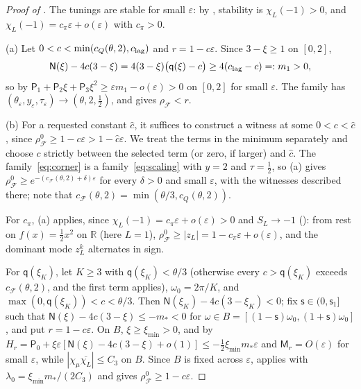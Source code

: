 \documentclass[11pt]{article}
\theoremstyle{definition}
\theoremstyle{remark}
\newcommand{\R}{\mathbb R}
\newcommand{\cF}{\mathcal F}
\newcommand{\sfP}{\mathsf P}
\newcommand{\rhoF}{\rho_{\cF}}
\newcommand{\rhoz}{\rho_{\cF}^{0}}
\newcommand{\cQ}{c_{Q}}
\newcommand{\cFF}{c_{\cF}}
\newcommand{\clag}{c_{\rm lag}}\newcommand{\clayer}{c_{\rm layer}}\newcommand{\cdisc}{c_{\rm disc}}
\newcommand{\cpi}{c_{\pi}}
\begin{document}
\begin{proof}[Proof of ]
The tunings are stable for small \(\varepsilon\): by , stability is
\(\chi_L(-1)>0\), and \(\chi_L(-1)=\cpi\varepsilon+o(\varepsilon)\) with \(\cpi>0\).

(a) Let \(0<c<\min(\cQ(\theta,2),\clag)\) and \(r=1-c\varepsilon\).  Since \(3-\xi\ge1\) on \([0,2]\),
\[
\mathsf N(\xi)-4c(3-\xi)=4(3-\xi)\bigl(\mathsf q(\xi)-c\bigr)\ge4(\clag-c)=:m_1>0 ,
\]
so by  \(\sfP_1+\sfP_2\xi+\sfP_3\xi^2\ge\varepsilon m_1-o(\varepsilon)>0\) on \([0,2]\) for small \(\varepsilon\).  The family has
\((\theta_\varepsilon,y_\varepsilon,\tau_\varepsilon)\to(\theta,2,\frac12)\), and  gives \(\rhoF<r\).

(b) For a requested constant \(\widehat c\), it suffices to construct a witness
at some \(0<c<\widehat c\), since
\(\rhoz\ge1-c\varepsilon>1-\widehat c\varepsilon\).
We treat the terms in the minimum separately and choose \(c\) strictly between
the selected term (or zero, if larger) and \(\widehat c\).
The family~\eqref{eq:corner} is a family~\eqref{eq:scaling} with \(y=2\)
and \(\tau=\frac12\), so (a) gives
\(\rhoz\ge e^{-(\cFF(\theta,2)+\delta)\varepsilon}\) for every \(\delta>0\) and small \(\varepsilon\), with the witnesses described there; note that
\(\cFF(\theta,2)=\min(\theta/3,\cQ(\theta,2))\).

For \(\cpi\), (a) applies, since \(\chi_L(-1)=\cpi\varepsilon+o(\varepsilon)>0\) and \(S_L\to-1\) (): from rest on \(f(x)=\frac12x^2\) on \(\R\) (here \(L=1\)),
\(\rhoz\ge|z_L|=1-\cpi\varepsilon+o(\varepsilon)\), and the dominant mode \(z_L^k\) alternates in sign.

For \(\mathsf q(\xi_K)\), let \(K\ge3\) with \(\mathsf q(\xi_K)<\theta/3\) (otherwise every \(c>\mathsf q(\xi_K)\) exceeds \(\cFF(\theta,2)\), and the first term
applies), \(\omega_0=2\pi/K\), and \(\max(0,\mathsf q(\xi_K))<c<\theta/3\).  Then \(\mathsf N(\xi_K)-4c(3-\xi_K)<0\); fix
\(\mathsf s\in(0,\mathsf s_1]\) such that \(\mathsf N(\xi)-4c(3-\xi)\le-m_*<0\) for \(\omega\in B=[(1-\mathsf s)\omega_0,(1+\mathsf s)\omega_0]\), and put
\(r=1-c\varepsilon\).  On \(B\), \(\xi\ge\xi_{\min}>0\), and by 
\(H_r=\sfP_0+\xi\varepsilon[\mathsf N(\xi)-4c(3-\xi)+o(1)]\le-\frac12\xi_{\min}m_*\varepsilon\) and \(\mathsf M_r=O(\varepsilon)\) for small \(\varepsilon\), while
\(|\chi_\mu\overline{\chi_L}|\le C_3\) on \(B\).  Since \(B\) is fixed across \(\varepsilon\),  applies with \(\lambda_0=\xi_{\min}m_*/(2C_3)\) and gives
\(\rhoz\ge1-c\varepsilon\).


\end{proof}
\end{document}
